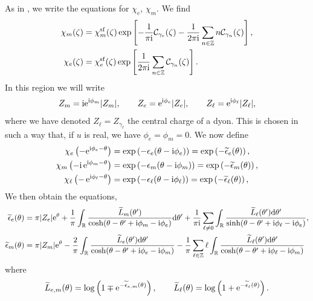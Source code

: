 \documentclass[a4paper,11pt]{article}
\theoremstyle{definition}
\newcommand{\CC}{{\cal C}}
\def\IZ{{\mathbb Z}}
\def\IR{{\mathbb R}}
\newcommand{\re}{{\rm e}}
\newcommand{\ri}{{\rm i}}
\newcommand{\rd}{{\rm d}}
\newcommand{\ba}{\begin{aligned}}
\newcommand{\ea}{\end{aligned}}
\def\IR{\mathbb{R}}
\def\IZ{\mathbb{Z}}
\begin{document}
As in \cite{cdorey}, we write the equations for $\chi_e$, $\chi_m$. We
find
%
\begin{equation}
  \ba
  \chi_m(\zeta)&= \chi_m^{\rm sf}(\zeta) \exp\left[ -{1\over  \pi \ri}
    \CC_{\gamma_e}(\zeta) -{1\over 2 \pi \ri} \sum_{n \in \IZ} n
    \CC_{\gamma_n}(\zeta) \right],\\ 
  \chi_e(\zeta)&=\chi_e^{\rm sf}(\zeta) \exp\left[ {1\over 2 \pi \ri}
    \sum_{n \in \IZ} \CC_{\gamma_n}(\zeta) \right].  
  \ea
\end{equation}
%
In this region we will write
%
\begin{equation}
  Z_m= \ri \re^{\ri \phi_m} |Z_m|, \qquad Z_e= \re^{\ri \phi_e} |Z_e|,
  \qquad Z_{\ell}=\re^{\ri \phi_\ell} |Z_\ell|,  
\end{equation}
%
where we have denoted $Z_\ell= Z_{\gamma_\ell}$ the central charge of
a dyon. This is chosen in such a way that, if $u$ is real, we have
$\phi_e=\phi_m=0$.  We now define %
\begin{equation}
  \ba
  \chi_e\left( -\re^{\ri \phi_e -\theta}\right)&=
  \exp\left(-\epsilon_e (\theta-\ri \phi_e) \right)=
  \exp\left(-\widetilde \epsilon_e (\theta) \right),\\ 
  \chi_m\left( -\ri \, \re^{\ri \phi_m -\theta}\right)&=
  \exp\left(-\epsilon_m (\theta-\ri \phi_m) \right)=
  \exp\left(-\widetilde \epsilon_m (\theta) \right), \\ 
  \chi_\ell \left( - \, \re^{\ri \phi_\ell -\theta}\right)&=
  \exp\left(-\epsilon_\ell (\theta-\ri \phi_\ell) \right)=
  \exp\left(-\widetilde \epsilon_\ell (\theta) \right),   
  \ea
\end{equation}
We then obtain the equations,
%
\begin{equation}\label{eq:cTBA-2}
  \ba
  \widetilde \epsilon_e(\theta)
  &=\pi |Z_e|  \re^\theta+{1\over \pi} \int_\IR {\widetilde L_m
    (\theta') \over \cosh(\theta-\theta'+\ri \phi_m- \ri \phi_e)} \rd
  \theta' 
  + 
  {1\over \pi \ri}  \sum_{\ell \not=0} \int_\IR {\widetilde
    L_\ell(\theta') \rd \theta' \over \sinh(\theta-\theta'+\ri
    \phi_\ell- \ri \phi_e)} , \\ 
  \widetilde \epsilon_m(\theta)&=\pi |Z_m|  \re^\theta-{2\over \pi}
  \int_\IR {\widetilde L_e (\theta')\rd \theta' \over
    \cosh(\theta-\theta'+\ri \phi_e- \ri \phi_m)}-{1\over \pi}
  \sum_{\ell \in \IZ} \ell \int_\IR {\widetilde L_\ell(\theta') \rd
    \theta' \over  \cosh(\theta-\theta'+\ri \phi_\ell- \ri \phi_m)} 
  \ea
\end{equation}
%
where
%
\begin{equation}
  \widetilde L_{e,m}(\theta) = \log\left(1\mp \re^{-\widetilde
      \epsilon_{e,m}(\theta)} \right), \qquad \widetilde
  L_{\ell}(\theta) = \log\left(1+ \re^{-\widetilde
      \epsilon_{\ell}(\theta)} \right). 
\end{equation}
\end{document}
